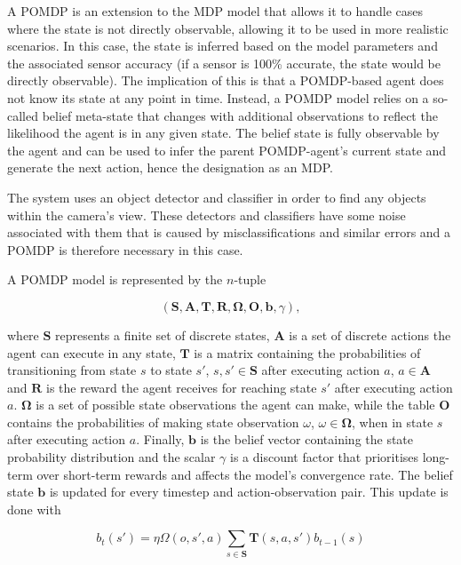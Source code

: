 \documentclass[runningheads]{llncs}
\begin{document}
A POMDP is an extension to the MDP model that allows it to handle cases where the state is not directly observable, allowing it to be used in more realistic scenarios. 
In this case, the state is inferred based on the model parameters and the associated sensor accuracy (if a sensor is 100\% accurate, the state would be directly observable).
The implication of this is that a POMDP-based agent does not know its state at any point in time.
Instead, a POMDP model relies on a so-called belief meta-state that changes with additional observations to reflect the likelihood the agent is in any given state.
The belief state is fully observable by the agent and can be used to infer the parent POMDP-agent's current state and generate the next action, hence the designation as an MDP.\@

The system uses an object detector and classifier in order to find any objects within the camera's view.
These detectors and classifiers have some noise associated with them that is caused by misclassifications and similar errors and a POMDP is therefore necessary in this case.

A POMDP model is represented by the $n$-tuple

\begin{equation}
  (\mathbf{S}, \mathbf{A}, \mathbf{T}, \mathbf{R}, \mathbf{\Omega}, \mathbf{O}, \mathbf{b}, \gamma),
\end{equation}

\noindent where $\mathbf{S}$ represents a finite set of discrete states, $\mathbf{A}$ is a set of discrete actions the agent can execute in any state, $\mathbf{T}$ is a matrix containing the probabilities of transitioning from state $s$ to state $s'$, $s, s' \in \mathbf{S}$ after executing action $a$, $a \in \mathbf{A}$ and $\mathbf{R}$ is the reward the agent receives for reaching state $s'$ after executing action $a$.
$\mathbf{\Omega}$ is a set of possible state observations the agent can make, while the table $\mathbf{O}$ contains the probabilities of making state observation $\omega$, $\omega \in \mathbf{\Omega}$, when in state $s$ after executing action $a$.
Finally, $\mathbf{b}$ is the belief vector containing the state probability distribution and the scalar $\gamma$ is a discount factor that prioritises long-term over short-term rewards and affects the model's convergence rate. 
The belief state $\mathbf{b}$ is updated for every timestep and action-observation pair.
This update is done with

\begin{equation}
  b_t(s') = \eta\Omega(o, s', a)\sum_{s\in\mathbf{S}}\mathbf{T}(s, a, s')b_{t-1}(s)
\end{equation}
\end{document}
